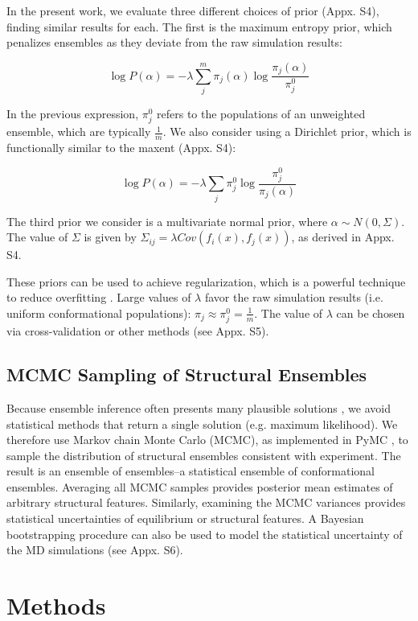 \documentclass[11pt,titlepage]{article}
\begin{document}
In the present work, we evaluate three different choices of prior (Appx. S4), finding similar results for each.  The first is the maximum entropy prior, which penalizes ensembles as they deviate from the raw simulation results:

$$\log P(\alpha) = -\lambda \sum_j^m \pi_j(\alpha) \log \frac{\pi_j(\alpha)}{\pi_j^0}$$

In the previous expression, $\pi_j^0$ refers to the populations of an unweighted ensemble, which are typically $\frac{1}{m}$.  We also consider using a Dirichlet prior, which is functionally similar to the maxent (Appx. S4):

$$\log P(\alpha) = -\lambda \sum_j \pi_j^0 \log \frac{\pi_j^0}{\pi_j(\alpha)}$$

The third prior we consider is a multivariate normal prior, where  $\alpha \sim N(0, \Sigma)$.  The value of $\Sigma$ is given by $\Sigma_{ij} = \lambda Cov(f_i(x), f_j(x))$, as derived in Appx. S4.

These priors can be used to achieve regularization, which is a powerful technique to reduce overfitting \cite{friedman2001elements}.  Large values of $\lambda$ favor the raw simulation results (i.e. uniform conformational populations): $\pi_j \approx \pi_j^0 = \frac{1}{m}$.  The value of $\lambda$ can be chosen via cross-validation or other methods (see Appx. S5).  

\subsection*{MCMC Sampling of Structural Ensembles}

Because ensemble inference often presents many plausible solutions  \citep{fisher2010, rieping2005}, we avoid statistical methods that return a single solution (e.g. maximum likelihood).  We therefore use Markov chain Monte Carlo (MCMC), as implemented in PyMC  \citep{patil2010pymc}, to sample the distribution of structural ensembles consistent with experiment.  The result is an ensemble of ensembles--a statistical ensemble of conformational ensembles.  Averaging all MCMC samples provides posterior mean  estimates of arbitrary structural features.  Similarly, examining the MCMC variances provides statistical uncertainties of equilibrium or structural features.  A Bayesian bootstrapping procedure  \citep{rubin1981} can also be used to model the statistical uncertainty of the MD simulations (see Appx. S6).

\section*{Methods}
\end{document}
